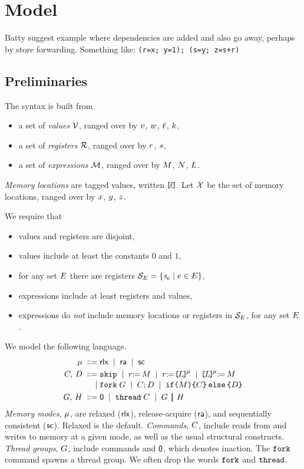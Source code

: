 \section{Model}

Batty suggest example where dependencies are added and also go away, perhaps
by store forwarding. Something like:
\texttt{(r=x; y=1); (s=y; z=s+r)}

\subsection{Preliminaries}
The syntax is built from
\begin{itemize}
\item a set of \emph{values} $\mathcal{V}$, ranged over by
  $v$, $w$, $\ell$, $k$,
\item a set of \emph{registers} $\mathcal{R}$, ranged over by
  $r$, $s$,
\item a set of \emph{expressions} $\mathcal{M}$, ranged over by
  $M$, $N$,  $L$.
\end{itemize}
\emph{Memory locations} are tagged values, written $\mkern-2mu\texttt{[}\mkern-2mu\ell \mkern-2mu\texttt{]}\mkern-2mu$.  Let $\mathcal{X}$
be the set of memory locations, ranged over by $x$, $y$, $z$.

We require that
\begin{itemize}
\item values and registers are disjoint, 
\item values include at least the constants $0$ and $1$,  
\item for any set $E$ there are registers $\mathcal{S}_{E}=\{\mathit{s}_{e}\mid e\in E\}$,
\item expressions include at least registers and values, 
\item expressions do \emph{not} include memory locations or registers in
  $\mathcal{S}_{E}$, for any set $E$.
\end{itemize}
We model the following language.
\begin{align*}
  \amode \BNFDEF& \mRLX
  \BNFSEP \mRA 
  \BNFSEP \mSC
  \\
  \aCmd,\,\bCmd
  \BNFDEF& \SKIP
  \BNFSEP \LET{\aReg}{\aExp}
  \BNFSEP \PRREF[\amode]{\cExp}{\aReg}
  \BNFSEP \PWREF[\amode]{\cExp}{\aExp}
  \\[-.5ex]
  \BNFSEP& \FORK{\aGrp}
  \BNFSEP \aCmd \SEMI \bCmd
  \BNFSEP \IF{\aExp} \THEN \aCmd \ELSE \bCmd \FI
  \\
  \aGrp ,\,\bGrp
  \BNFDEF& \NIL
  \BNFSEP\THREAD{\aCmd}
  \BNFSEP\aGrp \PAR \bGrp
\end{align*}
\emph{Memory modes}, $\mu$, are {relaxed} (${\mathsf{rlx}}$), {release-acquire}
(${\mathsf{ra}}$), and {sequentially consistent} (${\mathsf{sc}}$).  Relaxed is the default.
% 
\emph{Commands}, $C$, include reads from and writes to memory at a given
mode, as well as the usual structural constructs.
% 
\emph{Thread groups}, $G$, include commands and $\mathsf{0}$, which denotes
inaction. %
% 
The $\FORK{}$ command spawns a thread group.  We often drop the words
$\FORK{}$ and $\THREAD{}$.

